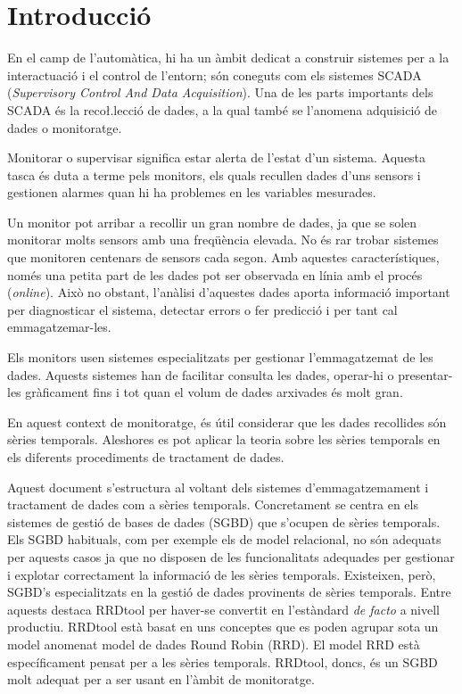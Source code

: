 \chapter{Introducció}


En el camp de l'automàtica, hi ha un àmbit dedicat a construir
sistemes per a la interactuació i el control de l'entorn; són coneguts
com els sistemes SCADA (\emph{Supervisory Control And Data
  Acquisition}).  Una de les parts importants dels SCADA és la
reco\l.lecció de dades, a la qual també se l'anomena adquisició de
dades o monitoratge.

Monitorar o supervisar significa estar alerta de l'estat d'un sistema.
Aquesta tasca és duta a terme pels monitors, els quals recullen dades
d'uns sensors i gestionen alarmes quan hi ha problemes en les
variables mesurades.

Un monitor pot arribar a recollir un gran nombre de dades, ja que se
solen monitorar molts sensors amb una freqüència elevada. No és rar
trobar sistemes que monitoren centenars de sensors cada segon. Amb
aquestes característiques, només una petita part de les dades pot ser
observada en línia amb el procés (\emph{online}).
Això no obstant, l'anàlisi d'aquestes dades aporta informació
important per diagnosticar el sistema, detectar errors o fer
predicció i per tant cal emmagatzemar-les. 

Els monitors usen sistemes especialitzats per gestionar l'emmagatzemat
de les dades. Aquests sistemes han de facilitar consulta les dades,
operar-hi o presentar-les gràficament fins i tot quan el volum de
dades arxivades és molt gran.

En aquest context de monitoratge, és útil considerar que les dades
recollides són sèries temporals. Aleshores es pot aplicar la teoria
sobre les sèries temporals en els diferents procediments de tractament
de dades.

Aquest document s'estructura al voltant dels sistemes
d'emmagatzemament i tractament de dades com a sèries temporals.
Concretament se centra en els sistemes de gestió de bases de dades
(SGBD) que s'ocupen de sèries temporals.  Els SGBD habituals, com per
exemple els de model relacional, no són adequats per aquests casos ja
que no disposen de les funcionalitats adequades per gestionar i
explotar correctament la informació de les sèries temporals.
%
Existeixen, però, SGBD's especialitzats en la gestió de dades
provinents de sèries temporals.  Entre aquests destaca RRDtool
per haver-se convertit en l'estàndard \emph{de facto} a nivell
productiu.  RRDtool està basat en uns conceptes que es poden
agrupar sota un model anomenat model de dades Round Robin (RRD). El
model RRD està específicament pensat per a les sèries
temporals. RRDtool, doncs, és un SGBD molt adequat per a ser usant en
l'àmbit de monitoratge.

